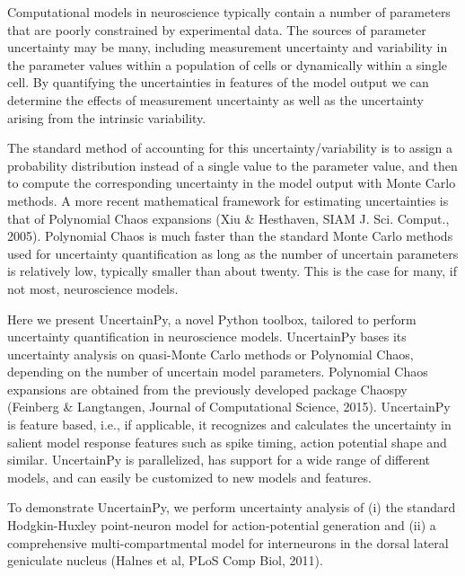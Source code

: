 Computational models in neuroscience typically contain a number of parameters
that are poorly constrained by experimental data. The sources of parameter
uncertainty may be many, including measurement uncertainty and variability in
the parameter values within a population of cells or dynamically within a single
cell. By quantifying the uncertainties in features of the model output we can
determine the effects of measurement uncertainty as well as the uncertainty
arising from the intrinsic variability.

The standard method of accounting for this uncertainty/variability is to assign
a probability distribution instead of a single value to the parameter value, and
then to compute the corresponding uncertainty in the model output with Monte
Carlo methods.  A more recent mathematical framework for estimating
uncertainties is that of Polynomial Chaos expansions (Xiu & Hesthaven, SIAM J.
Sci. Comput., 2005). Polynomial Chaos is much faster than the standard Monte
Carlo methods used for uncertainty quantification as long as the number of
uncertain parameters is relatively low, typically smaller than about twenty.
This is the case for many, if not most, neuroscience models.

Here we present UncertainPy, a novel Python toolbox, tailored to perform
uncertainty quantification in neuroscience models. UncertainPy bases its
uncertainty analysis on quasi-Monte Carlo methods or Polynomial Chaos, depending
on the number of uncertain model parameters. Polynomial Chaos expansions are
obtained from the previously developed package Chaospy (Feinberg & Langtangen,
Journal of Computational Science, 2015). UncertainPy is feature based, i.e., if
applicable, it recognizes and calculates the uncertainty in salient model
response features such as spike timing, action potential shape and similar.
UncertainPy is parallelized, has support for a wide range of different models,
and can easily be customized to new models and features.

To demonstrate UncertainPy, we perform uncertainty analysis of (i) the standard
Hodgkin-Huxley point-neuron model for action-potential generation and (ii) a
comprehensive multi-compartmental model for interneurons in the dorsal lateral
geniculate nucleus (Halnes et al, PLoS Comp Biol, 2011).
